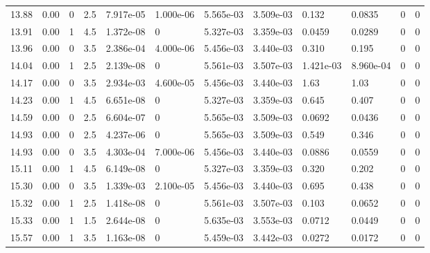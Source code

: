 \documentclass[preview]{standalone}
\begin{document}
{{{\begin{tabular}{L{1.2cm}C{1.2cm} C{0.3cm}C{0.5cm} C{1.4cm}C{1.4cm} C{1.4cm}C{1.4cm} C{1.6cm}C{1.6cm} C{1.6cm}C{1.6cm}}
  13.88  &  0.00  & 0     & 2.5 &  7.917e-05  & 1.000e-06  &  5.565e-03&   3.509e-03& 0.132 & 0.0835   &  0 & 0  \\ 
  13.91  &  0.00  & 1     & 4.5 &  1.372e-08  & 0  &  5.327e-03&   3.359e-03& 0.0459 & 0.0289   &  0 & 0  \\ 
  13.96  &  0.00  & 0     & 3.5 &  2.386e-04  & 4.000e-06  &  5.456e-03&   3.440e-03& 0.310 & 0.195   &  0 & 0  \\ 
  14.04  &  0.00  & 1     & 2.5 &  2.139e-08  & 0  &  5.561e-03&   3.507e-03& 1.421e-03 & 8.960e-04   &  0 & 0  \\ 
  14.17  &  0.00  & 0     & 3.5 &  2.934e-03  & 4.600e-05  &  5.456e-03&   3.440e-03& 1.63 & 1.03   &  0 & 0  \\ 
  14.23  &  0.00  & 1     & 4.5 &  6.651e-08  & 0  &  5.327e-03&   3.359e-03& 0.645 & 0.407   &  0 & 0  \\ 
  14.59  &  0.00  & 0     & 2.5 &  6.604e-07  & 0  &  5.565e-03&   3.509e-03& 0.0692 & 0.0436   &  0 & 0  \\ 
  14.93  &  0.00  & 0     & 2.5 &  4.237e-06  & 0  &  5.565e-03&   3.509e-03& 0.549 & 0.346   &  0 & 0  \\ 
  14.93  &  0.00  & 0     & 3.5 &  4.303e-04  & 7.000e-06  &  5.456e-03&   3.440e-03& 0.0886 & 0.0559   &  0 & 0  \\ 
  15.11  &  0.00  & 1     & 4.5 &  6.149e-08  & 0  &  5.327e-03&   3.359e-03& 0.320 & 0.202   &  0 & 0  \\ 
  15.30  &  0.00  & 0     & 3.5 &  1.339e-03  & 2.100e-05  &  5.456e-03&   3.440e-03& 0.695 & 0.438   &  0 & 0  \\ 
  15.32  &  0.00  & 1     & 2.5 &  1.418e-08  & 0  &  5.561e-03&   3.507e-03& 0.103 & 0.0652   &  0 & 0  \\ 
  15.33  &  0.00  & 1     & 1.5 &  2.644e-08  & 0  &  5.635e-03&   3.553e-03& 0.0712 & 0.0449   &  0 & 0  \\ 
  15.57  &  0.00  & 1     & 3.5 &  1.163e-08  & 0  &  5.459e-03&   3.442e-03& 0.0272 & 0.0172   &  0 & 0  \\ 
\hline 
\end{tabular} 

}}}
\end{document}
